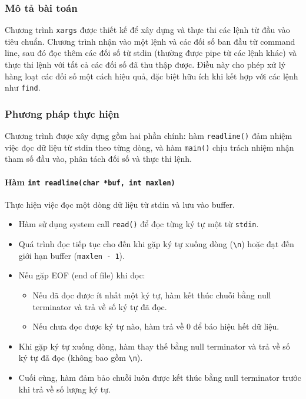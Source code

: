 \subsubsection{Mô tả bài toán}
Chương trình \texttt{xargs} được thiết kế để xây dựng và thực thi các lệnh từ đầu vào tiêu chuẩn.
Chương trình nhận vào một lệnh và các đối số ban đầu từ command line, sau đó đọc thêm các đối số từ stdin (thường được pipe từ các lệnh khác) và thực thi lệnh với tất cả các đối số đã thu thập được.
Điều này cho phép xử lý hàng loạt các đối số một cách hiệu quả, đặc biệt hữu ích khi kết hợp với các lệnh như \texttt{find}.

\subsubsection{Phương pháp thực hiện}
Chương trình được xây dựng gồm hai phần chính: hàm \texttt{readline()} đảm nhiệm việc đọc dữ liệu từ stdin theo từng dòng, và hàm \texttt{main()} chịu trách nhiệm nhận tham số đầu vào, phân tách đối số và thực thi lệnh.

\paragraph{Hàm \texttt{int readline(char *buf, int maxlen)}}
Thực hiện việc đọc một dòng dữ liệu từ stdin và lưu vào buffer.
\begin{itemize}
    \item Hàm sử dụng system call \texttt{read()} để đọc từng ký tự một từ \texttt{stdin}.
    \item Quá trình đọc tiếp tục cho đến khi gặp ký tự xuống dòng (\texttt{\textbackslash n}) hoặc đạt đến giới hạn buffer (\texttt{maxlen - 1}).
    \item Nếu gặp EOF (end of file) khi đọc:
    \begin{itemize}
        \item Nếu đã đọc được ít nhất một ký tự, hàm kết thúc chuỗi bằng null terminator và trả về số ký tự đã đọc.
        \item Nếu chưa đọc được ký tự nào, hàm trả về 0 để báo hiệu hết dữ liệu.
    \end{itemize}
    \item Khi gặp ký tự xuống dòng, hàm thay thế bằng null terminator và trả về số ký tự đã đọc (không bao gồm \texttt{\textbackslash n}).
    \item Cuối cùng, hàm đảm bảo chuỗi luôn được kết thúc bằng null terminator trước khi trả về số lượng ký tự.
\end{itemize}


